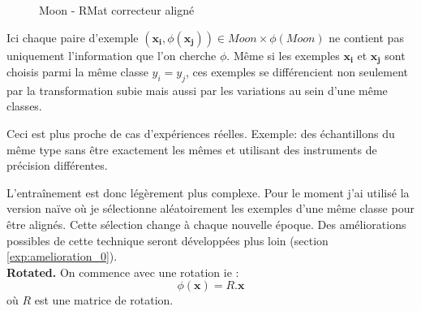 \begin{figure}[H] %
\centering
{}
\hfill
{}
\caption{Moon - RMat correcteur aligné}
\label{fig:moon_rmat_pairwise}
\end{figure}




Ici chaque paire d'exemple $(\pmb{x_i}, \phi(\pmb{x_j})) \in Moon\times \phi(Moon)$
ne contient pas uniquement l'information que l'on cherche $\phi$. Même si
les exemples $\pmb{x_i}$ et $\pmb{x_j}$ sont choisis parmi la même classe
$y_i=y_j$, ces exemples se différencient non seulement par la transformation 
subie mais aussi par les variations au sein d'une même classes.

Ceci est plus proche de cas d'expériences réelles. Exemple: des échantillons
du même type sans être exactement les mêmes et utilisant des instruments
de précision différentes.

L'entraînement est donc légèrement plus complexe. Pour le moment j'ai utilisé 
la version naïve où je sélectionne aléatoirement les exemples d'une même classe
pour être alignés. Cette sélection change à chaque nouvelle époque. Des 
améliorations possibles de cette technique seront développées plus loin 
(section \ref{exp:amelioration_0}).\\



{\Large\textbf{Rotated.}} On commence avec une rotation ie :
$$ \phi(\pmb{x}) = R.\pmb{x}$$
où $R$ est une matrice de rotation.

